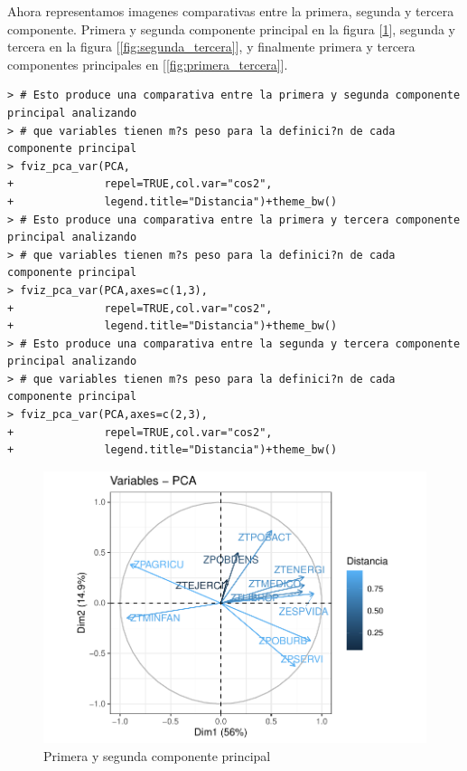 \documentclass[12pt,twoside]{report}
\begin{document}
Ahora representamos imagenes comparativas entre la primera, segunda y tercera componente. Primera y segunda componente principal en la figura [\ref{fig:primera_segunda}], segunda y tercera en la figura [\ref{fig:segunda_tercera}], y finalmente primera y tercera componentes principales en [\ref{fig:primera_tercera}].

\begin{lstlisting}
> # Esto produce una comparativa entre la primera y segunda componente principal analizando 
> # que variables tienen m?s peso para la definici?n de cada componente principal
> fviz_pca_var(PCA,
+              repel=TRUE,col.var="cos2",
+              legend.title="Distancia")+theme_bw()
> # Esto produce una comparativa entre la primera y tercera componente principal analizando 
> # que variables tienen m?s peso para la definici?n de cada componente principal
> fviz_pca_var(PCA,axes=c(1,3),
+              repel=TRUE,col.var="cos2",
+              legend.title="Distancia")+theme_bw()
> # Esto produce una comparativa entre la segunda y tercera componente principal analizando 
> # que variables tienen m?s peso para la definici?n de cada componente principal
> fviz_pca_var(PCA,axes=c(2,3),
+              repel=TRUE,col.var="cos2",
+              legend.title="Distancia")+theme_bw()
\end{lstlisting}

\begin{figure}[H]
\includegraphics[width=\textwidth]{../code/figures/primera_segunda.pdf}
\caption{Primera y segunda componente principal}
\label{fig:primera_segunda}
\end{figure} 
\end{document}
